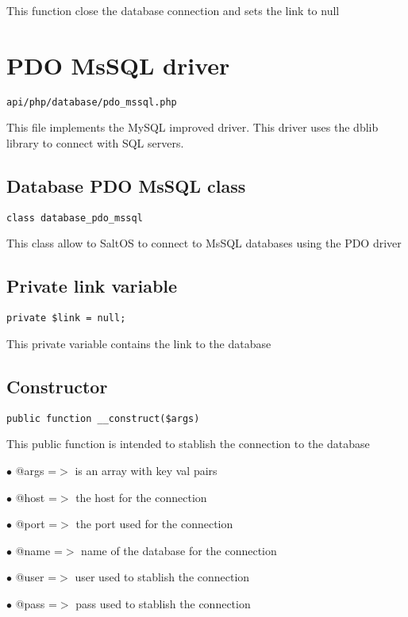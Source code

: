 \documentclass[a4paper]{book}
\begin{document}
This function close the database connection and sets the link to null

\hypertarget{toc363}{}
\section{PDO MsSQL driver}

\begin{lstlisting}
api/php/database/pdo_mssql.php
\end{lstlisting}

This file implements the MySQL improved driver. This driver uses the dblib library to connect
with SQL servers.

\hypertarget{toc364}{}
\subsection{Database PDO MsSQL class}

\begin{lstlisting}
class database_pdo_mssql
\end{lstlisting}

This class allow to SaltOS to connect to MsSQL databases using the PDO driver

\hypertarget{toc365}{}
\subsection{Private link variable}

\begin{lstlisting}
private $link = null;
\end{lstlisting}

This private variable contains the link to the database

\hypertarget{toc366}{}
\subsection{Constructor}

\begin{lstlisting}
public function __construct($args)
\end{lstlisting}

This public function is intended to stablish the connection to the database

\begin{compactitem}
\item[\color{myblue}$\bullet$] @args =$>$ is an array with key val pairs
\item[\color{myblue}$\bullet$] @host =$>$ the host for the connection
\item[\color{myblue}$\bullet$] @port =$>$ the port used for the connection
\item[\color{myblue}$\bullet$] @name =$>$ name of the database for the connection
\item[\color{myblue}$\bullet$] @user =$>$ user used to stablish the connection
\item[\color{myblue}$\bullet$] @pass =$>$ pass used to stablish the connection
\end{compactitem}
\end{document}

